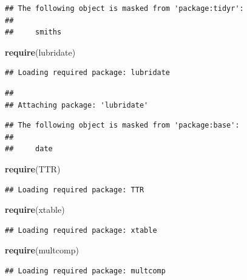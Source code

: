 \documentclass[]{article}
\newenvironment{Shaded}{\begin{snugshade}}{\end{snugshade}}
\newcommand{\KeywordTok}[1]{\textcolor[rgb]{0.13,0.29,0.53}{\textbf{{#1}}}}
\newcommand{\NormalTok}[1]{{#1}}
\begin{document}
\begin{verbatim}
## The following object is masked from 'package:tidyr':
## 
##     smiths
\end{verbatim}

\begin{Shaded}
\begin{Highlighting}[]
\KeywordTok{require}\NormalTok{(lubridate)}
\end{Highlighting}
\end{Shaded}

\begin{verbatim}
## Loading required package: lubridate
\end{verbatim}

\begin{verbatim}
## 
## Attaching package: 'lubridate'
\end{verbatim}

\begin{verbatim}
## The following object is masked from 'package:base':
## 
##     date
\end{verbatim}

\begin{Shaded}
\begin{Highlighting}[]
\KeywordTok{require}\NormalTok{(TTR)}
\end{Highlighting}
\end{Shaded}

\begin{verbatim}
## Loading required package: TTR
\end{verbatim}

\begin{Shaded}
\begin{Highlighting}[]
\KeywordTok{require}\NormalTok{(xtable)}
\end{Highlighting}
\end{Shaded}

\begin{verbatim}
## Loading required package: xtable
\end{verbatim}

\begin{Shaded}
\begin{Highlighting}[]
\KeywordTok{require}\NormalTok{(multcomp)}
\end{Highlighting}
\end{Shaded}

\begin{verbatim}
## Loading required package: multcomp
\end{verbatim}
\end{document}
